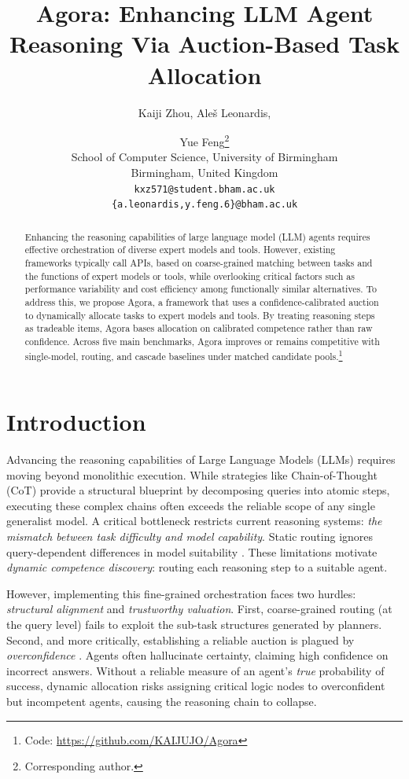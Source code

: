 \documentclass[11pt]{article}
\title{Agora: Enhancing LLM Agent Reasoning Via Auction-Based Task Allocation}
\author{
  Kaiji Zhou, Ale\v{s} Leonardis, \and Yue Feng\thanks{Corresponding author.} \\
  School of Computer Science, University of Birmingham \\
  Birmingham, United Kingdom \\
  \texttt{kxz571@student.bham.ac.uk} \\
  \texttt{\{a.leonardis,y.feng.6\}@bham.ac.uk}
}
\begin{document}
\maketitle
\begin{abstract}
Enhancing the reasoning capabilities of large language model (LLM) agents requires effective orchestration of diverse expert models and tools. However, existing frameworks typically call  APIs, based on coarse-grained matching between tasks and the functions of expert models or tools, while overlooking critical factors such as performance variability and cost efficiency among functionally similar alternatives.
To address this, we propose Agora, a framework that uses a confidence-calibrated auction to dynamically allocate tasks to expert models and tools.
By treating reasoning steps as tradeable items, Agora bases allocation on calibrated competence rather than raw confidence.
Across five main benchmarks, Agora improves or remains competitive with single-model, routing, and cascade baselines under matched candidate pools.\footnote{Code: \url{https://github.com/KAIJUJO/Agora}}
\end{abstract}

\section{Introduction}
\label{sec:intro}

Advancing the reasoning capabilities of Large Language Models (LLMs) requires moving beyond monolithic execution. 
While strategies like Chain-of-Thought (CoT) \citep{wei2023chain} provide a structural blueprint by decomposing queries into atomic steps, executing these complex chains often exceeds the reliable scope of any single generalist model.
A critical bottleneck restricts current reasoning systems: \emph{the mismatch between task difficulty and model capability}.
Static routing ignores query-dependent differences in model suitability \citep{nguyen2025metallmhighperformantcostefficientdynamic}.
These limitations motivate \emph{dynamic competence discovery}: routing each reasoning step to a suitable agent.

However, implementing this fine-grained orchestration faces two hurdles: \textit{structural alignment} and \textit{trustworthy valuation}. First, coarse-grained routing (at the query level) fails to exploit the sub-task structures generated by planners. Second, and more critically, establishing a reliable auction is plagued by \textit{overconfidence} \citep{Huang_2025}. Agents often hallucinate certainty, claiming high confidence on incorrect answers. Without a reliable measure of an agent's \textit{true} probability of success, dynamic allocation risks assigning critical logic nodes to overconfident but incompetent agents, causing the reasoning chain to collapse.
\end{document}
